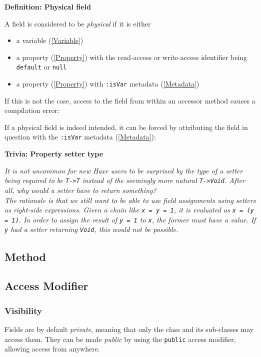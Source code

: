 \documentclass{article}
\newcommand{\type}[1]{\texttt{#1}}
\newcommand{\expr}[1]{\texttt{#1}}
\newenvironment{myshaded}
  {\def\FrameCommand{\fboxsep=\topsep\colorbox{bgcolor}}%
  \MakeFramed {\advance\hsize-\width \FrameRestore}}%
 {\endMakeFramed}
\newcommand{\define}[3][Definition]
	{\begin{myshaded}\noindent\textbf{#1: #2}\par\nobreak\noindent\ignorespaces#3\label{def:#2}\end{myshaded}}
\newcommand{\trivia}[2]
	{\begin{myshaded}\noindent\textbf{Trivia: #1}\par\nobreak\noindent\ignorespaces\textit{#2}\end{myshaded}}
\newcommand{\tref}[2]{#1 (\ref{#2})}
\begin{document}
\define{Physical field}{A field is considered to be \emph{physical} if it is either
	\begin{itemize}
		\item a \tref{variable}{Variable}
		\item a \tref{property}{Property} with the read-access or write-access identifier being \expr{default} or \expr{null}
		\item a \tref{property}{Property} with \expr{:isVar} \tref{metadata}{Metadata}
	\end{itemize}
}

If this is not the case, access to the field from within an accessor method causes a compilation error:



If a physical field is indeed intended, it can be forced by attributing the field in question with the \expr{:isVar} \tref{metadata}{Metadata}:




\trivia{Property setter type}{It is not uncommon for new Haxe users to be surprised by the type of a setter being required to be \type{T->T} instead of the seemingly more natural \type{T->Void}. After all, why would a \emph{setter} have to return something?\\
The rationale is that we still want to be able to use field assignments using setters as right-side expressions. Given a chain like \expr{x = y = 1}, it is evaluated as \expr{x = (y = 1)}. In order to assign the result of \expr{y = 1} to \expr{x}, the former must have a value. If \expr{y} had a setter returning \type{Void}, this would not be possible.}


\subsection{Method}
\label{Method}


\subsection{Access Modifier}
\label{Access Modifier}

\subsubsection{Visibility}
\label{Visibility}

Fields are by default \emph{private}, meaning that only the class and its sub-classes may access them. They can be made \emph{public} by using the \expr{public} access modifier, allowing access from anywhere.
\end{document}
